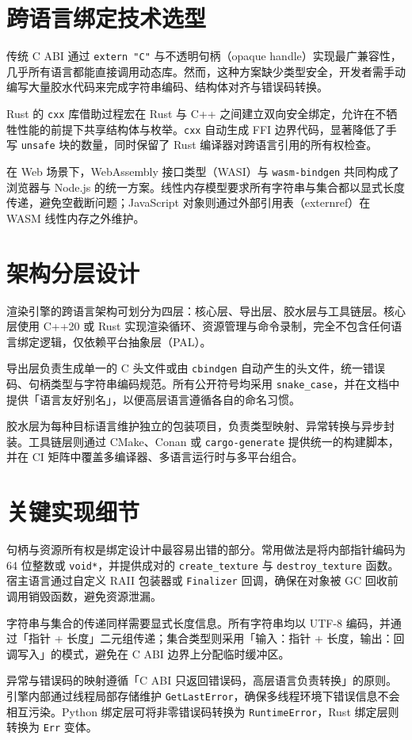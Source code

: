 \chapter{跨语言绑定技术选型}
传统 C ABI 通过 \texttt{extern "C"} 与不透明句柄（opaque handle）实现最广兼容性，几乎所有语言都能直接调用动态库。然而，这种方案缺少类型安全，开发者需手动编写大量胶水代码来完成字符串编码、结构体对齐与错误码转换。\par
Rust 的 \texttt{cxx} 库借助过程宏在 Rust 与 C++ 之间建立双向安全绑定，允许在不牺牲性能的前提下共享结构体与枚举。\texttt{cxx} 自动生成 FFI 边界代码，显著降低了手写 \texttt{unsafe} 块的数量，同时保留了 Rust 编译器对跨语言引用的所有权检查。\par
在 Web 场景下，WebAssembly 接口类型（WASI）与 \texttt{wasm-bindgen} 共同构成了浏览器与 Node.js 的统一方案。线性内存模型要求所有字符串与集合都以显式长度传递，避免空截断问题；JavaScript 对象则通过外部引用表（externref）在 WASM 线性内存之外维护。\par
\chapter{架构分层设计}
渲染引擎的跨语言架构可划分为四层：核心层、导出层、胶水层与工具链层。核心层使用 C++20 或 Rust 实现渲染循环、资源管理与命令录制，完全不包含任何语言绑定逻辑，仅依赖平台抽象层（PAL）。\par
导出层负责生成单一的 C 头文件或由 \texttt{cbindgen} 自动产生的头文件，统一错误码、句柄类型与字符串编码规范。所有公开符号均采用 \texttt{snake\_{}case}，并在文档中提供「语言友好别名」，以便高层语言遵循各自的命名习惯。\par
胶水层为每种目标语言维护独立的包装项目，负责类型映射、异常转换与异步封装。工具链层则通过 CMake、Conan 或 \texttt{cargo-generate} 提供统一的构建脚本，并在 CI 矩阵中覆盖多编译器、多语言运行时与多平台组合。\par
\chapter{关键实现细节}
句柄与资源所有权是绑定设计中最容易出错的部分。常用做法是将内部指针编码为 64 位整数或 \texttt{void*}，并提供成对的 \texttt{create\_{}texture} 与 \texttt{destroy\_{}texture} 函数。宿主语言通过自定义 RAII 包装器或 \texttt{Finalizer} 回调，确保在对象被 GC 回收前调用销毁函数，避免资源泄漏。\par
字符串与集合的传递同样需要显式长度信息。所有字符串均以 UTF-8 编码，并通过「指针 + 长度」二元组传递；集合类型则采用「输入：指针 + 长度，输出：回调写入」的模式，避免在 C ABI 边界上分配临时缓冲区。\par
异常与错误码的映射遵循「C ABI 只返回错误码，高层语言负责转换」的原则。引擎内部通过线程局部存储维护 \texttt{GetLastError}，确保多线程环境下错误信息不会相互污染。Python 绑定层可将非零错误码转换为 \texttt{RuntimeError}，Rust 绑定层则转换为 \texttt{Err} 变体。\par
